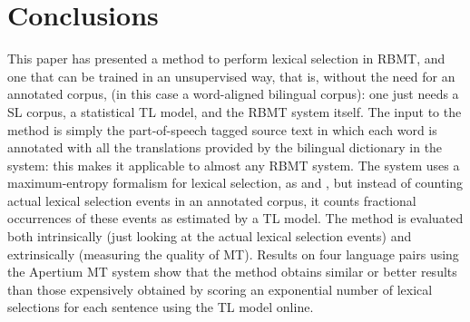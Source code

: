 \documentclass[11pt]{article}
\newcommand{\todomlf}[1]{\renewcommand{\baselinestretch}{0.55}\todo{\scriptsize\sf MLF: #1}\renewcommand{\baselinestretch}{1.0}}
\newcommand{\comment}[1]{\todo{#1}}
\begin{document}
\section{Conclusions}

This paper has presented a method to perform lexical selection in
RBMT, and one that can be trained in an unsupervised way, that is,
without the need for an annotated corpus, (in this case a word-aligned
bilingual corpus): one just needs a SL corpus, a statistical TL model,
and the RBMT system itself. The input to the method is simply the
part-of-speech tagged source text in which each word is annotated with
all the translations provided by the bilingual dictionary in the
system: this makes it applicable to almost any RBMT system. The system
uses a maximum-entropy formalism for lexical selection, as
\cite{berger1996} and \cite{marechek10}, but instead of counting
actual lexical selection events in an annotated corpus, it counts
fractional occurrences of these events as estimated by a TL model. The
method is evaluated both intrinsically (just looking at the actual
lexical selection events) and extrinsically (measuring the quality of
MT). Results on four language pairs using the Apertium
\citep{forcada2011apertium} MT system show that the method obtains
similar or better results than those expensively obtained by scoring
an exponential number of lexical selections for each sentence using
the TL model online.%

\end{document}
